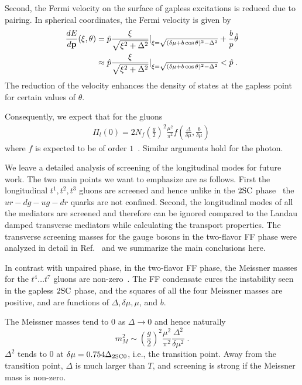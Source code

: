\documentclass[10pt, aps, prd, superscriptaddress, nofootinbib, 
               amsmath, amssymb, twocolumn,
               preprintnumbers, showpacs,
               raggedbottom,
               floatfix]{revtex4-1}
\newcommand{\bfp}{{\bf{p}}}
\newcommand{\SC}{{\rm{SC}}}
\begin{document}
Second, the Fermi velocity on the surface of gapless excitations is reduced due
to pairing. In spherical coordinates, the Fermi velocity is given by 
\begin{equation}
\begin{split}
\frac{dE}{d\bfp}(\xi,\theta) &=
\hat{p}\frac{\xi}{\sqrt{\xi^2+\Delta^2}}|_{\xi=\sqrt{(\delta\mu+b\cos\theta)^2-\Delta^2}}+\frac{b}{p}\hat{\theta}\\
&\approx
\hat{p}\frac{\xi}{\sqrt{\xi^2+\Delta^2}}|_{\xi=\sqrt{(\delta\mu+b\cos\theta)^2-\Delta^2}}<\hat{p}\;.
\end{split}
\end{equation}
The reduction of the velocity enhances the density of states at the gapless
point~\cite{Alford:2005pooja} for certain values of $\theta$. 

Consequently, we expect that for the gluons
\begin{equation}
\begin{split}
\Pi_l(0) = 2N_f (\frac{g}{2})^2
\frac{\mu^2}{\pi^2} f(\frac{\Delta}{\delta\mu},\frac{b}{\delta\mu})~\label{eq:mD2SUN_fFF}
\end{split}
\end{equation}
where $f$ is expected to be of order $1$~\cite{Casalbuoni:2002my}. Similar
arguments hold for the photon.

We leave a detailed analysis of screening of the longitudinal modes for future
work. The two main points we want to emphasize are as follows. First the
longitudinal $t^1, t^2, t^3$ gluons are screened and hence unlike in the $2\SC$
phase~\cite{Rischke:2000cn} the $ur-dg-ug-dr$ quarks are not confined.  Second,
the longitudinal modes of all the mediators are screened and therefore can be
ignored compared to the Landau damped transverse mediators while calculating
the transport properties.  The transverse screening masses for the gauge bosons
in the two-flavor FF phase were analyzed in detail in
Ref.~\cite{Giannakis:2004pf,Giannakis:2005vw} and we summarize the main
conclusions here.

In contrast with unpaired phase, in the two-flavor FF phase, the Meissner
masses for the $t^4\dots t^7$ gluons are
non-zero~\cite{Giannakis:2004pf,Giannakis:2005vw,Ciminale:2006sm}. The FF
condensate cures the instability seen in the gapless $2\SC$ phase, and the
squares of all the four Meissner masses are positive, and are functions of
$\Delta, \delta\mu, \mu$, and $b$.

The Meissner masses tend to $0$ as $\Delta\rightarrow 0$ and hence naturally 
\begin{equation}
m_M^2\sim (\frac{g}{2})^2
\frac{\mu^2}{\pi^2}\frac{\Delta^2}{\delta\mu^2}\;.
\end{equation}
$\Delta^2$ tends to $0$ at $\delta\mu=0.754\Delta_{2\SC0}$, i.e., the transition
point. Away from the transition point, $\Delta$ is much larger
than $T$, and screening is strong if the Meissner mass is
non-zero.
\end{document}
